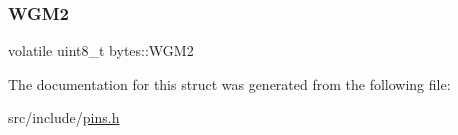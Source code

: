 \mbox{\label{structbytes_a89629be7fefa4977a3caa8f221b91054}} 
\subsubsection{\texorpdfstring{W\+G\+M2}{WGM2}}
{\footnotesize\ttfamily volatile uint8\+\_\+t bytes\+::\+W\+G\+M2}



The documentation for this struct was generated from the following file\+:\begin{DoxyCompactItemize}
\item 
src/include/\mbox{\hyperlink{pins_8h}{pins.\+h}}\end{DoxyCompactItemize}
